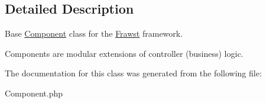 \subsection{Detailed Description}
Base \hyperlink{classComponent}{Component} class for the \hyperlink{classFrawst}{Frawst} framework.

Components are modular extensions of controller (business) logic. 

The documentation for this class was generated from the following file:\begin{DoxyCompactItemize}
\item 
Component.php\end{DoxyCompactItemize}
